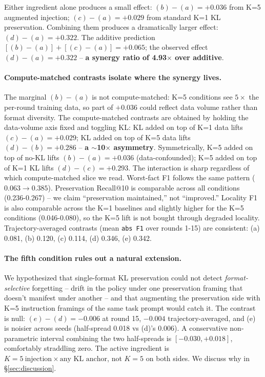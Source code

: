 \documentclass[11pt]{article}
\newcommand{\code}[1]{\texttt{\small #1}}
\begin{document}
Either ingredient alone produces a small effect:
$(b) - (a) = +0.036$ from K=5 augmented injection;
$(c) - (a) = +0.029$ from standard K=1 KL preservation. Combining them
produces a dramatically larger effect: $(d) - (a) = +0.322$. The additive
prediction $[(b) - (a)] + [(c) - (a)] = +0.065$; the observed effect
$(d) - (a) = +0.322$ -- \textbf{a synergy ratio of 4.93$\times$ over
additive}.

\paragraph{Compute-matched contrasts isolate where the synergy lives.}
The marginal $(b) - (a)$ is not compute-matched: K=5 conditions see
$5\times$ the per-round training data, so part of $+0.036$ could reflect
data volume rather than format diversity. The compute-matched contrasts
are obtained by holding the data-volume axis fixed and toggling KL: KL
added on top of K=1 data lifts $(c) - (a) = +0.029$; KL added on top of
K=5 data lifts $(d) - (b) = +0.286$ -- \textbf{a $\sim$10$\times$
asymmetry}. Symmetrically, K=5 added on top of no-KL lifts
$(b) - (a) = +0.036$ (data-confounded); K=5 added on top of K=1 KL lifts
$(d) - (c) = +0.293$. The interaction is sharp regardless of which
compute-matched slice we read. Worst-fact F1 follows the same pattern
($0.063 \to 0.385$). Preservation Recall@10 is comparable across all
conditions (0.236-0.267) -- we claim ``preservation maintained,'' not
``improved.'' Locality F1 is also comparable across the K=1 baselines and
slightly higher for the K=5 conditions (0.046-0.080), so the K=5 lift is
not bought through degraded locality. Trajectory-averaged contrasts (mean
\code{abs F1} over rounds 1-15) are consistent: (a) 0.081, (b) 0.120,
(c) 0.114, (d) 0.346, (e) 0.342.

\paragraph{The fifth condition rules out a natural extension.}
We hypothesized that single-format KL preservation could not detect
\emph{format-selective} forgetting -- drift in the policy under one
preservation framing that doesn't manifest under another -- and that
augmenting the preservation side with K=5 instruction framings of the same
task prompt would catch it. The contrast is null:
$(e) - (d) = -0.006$ at round 15, $-0.004$ trajectory-averaged, and (e) is
noisier across seeds (half-spread 0.018 vs (d)'s 0.006). A conservative
non-parametric interval combining the two half-spreads is
$[-0.030, +0.018]$, comfortably straddling zero. The active ingredient is
$K=5\ \text{injection} \times \text{any KL anchor}$, not $K=5$ on both
sides. We discuss why in \S\ref{sec:discussion}.
\end{document}
